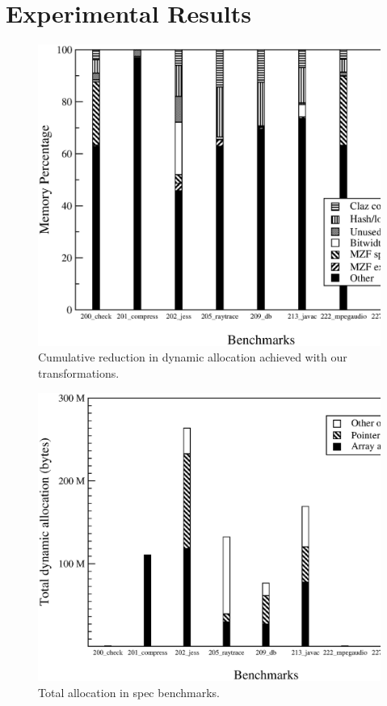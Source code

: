 \documentclass[preprint]{acmconf}
\begin{document}
\section{Experimental Results}
\begin{figure}
\includegraphics[scale=0.32,clip=true]{Figures/spaceopt.eps}
\caption{Cumulative reduction in dynamic allocation achieved with
  our transformations.}
\label{fig:total}
\end{figure}
\begin{figure}
\includegraphics[scale=0.32,clip=true]{Figures/spec-space.eps}
\caption{Total allocation in spec benchmarks.}
\label{fig:space}
\end{figure}
\end{document}
